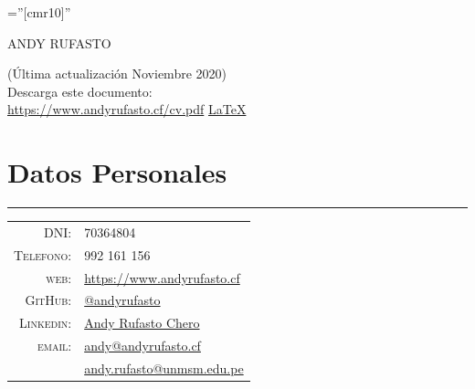 \documentclass[a4paper,10pt]{article}
\begin{document}
\pagestyle{empty} %

\font\fb=''[cmr10]'' %


\par{\centering
		{\Huge ANDY RUFASTO\\ \bigskip\par} }



\hfill\begin{minipage}{0.5\linewidth}
	(Última actualización Noviembre 2020)\\ 
	Descarga este documento:\\
 	\href{https://www.andyrufasto.cf/cv.pdf}{https://www.andyrufasto.cf/cv.pdf}
	\href{https://www.github.com/andyrufasto.cf/cv}{\LaTeX}
\end{minipage}

\section{Datos Personales}
	\hrule
	\begin{tabular}{rl}
    \textsc{DNI:}       & 70364804\\
    \textsc{Telefono:}  & 992 161 156\\
    \textsc{web:}       & \href{https://www.andyrufasto.cf}{https://www.andyrufasto.cf}\\
    \textsc{GitHub:}    & \href{https://www.github.com/andyrufasto}{@andyrufasto}\\
    \textsc{Linkedin:}  & \href{https://www.linkedin.com/in/andyrufasto/}{Andy Rufasto Chero}\\
    \textsc{email:}     & \href{mailto:andy@andyrufasto.cf}{andy@andyrufasto.cf}\\
				                & \href{mailto:andy.rufasto@unmsm.edu.pe}{andy.rufasto@unmsm.edu.pe}\\
	\end{tabular}
\end{document}
